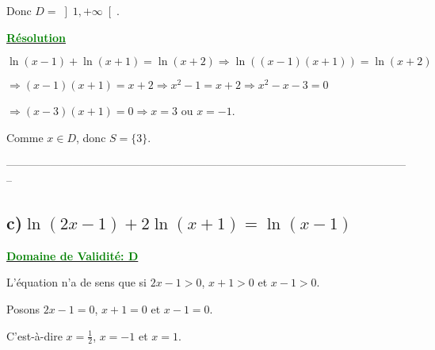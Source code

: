 \documentclass[12pt]{article}
\begin{document}
Donc $D=\left]1, +\infty\right[$.

\textbf{\underline{\textcolor{green}{Résolution}}}

$\ln(x-1) + \ln(x+1) = \ln(x+2) \Longrightarrow \ln((x-1)(x+1)) = \ln(x+2)$

$\Longrightarrow (x-1)(x+1) = x+2 \Longrightarrow x^2 - 1 = x+2 \Longrightarrow x^2 - x - 3 = 0$

$\Longrightarrow (x-3)(x+1) = 0 \Longrightarrow x=3$ ou $x=-1$.

Comme $x \in D$, donc $S=\{3\}$.

--------------------------------------------------------------------------------------------------------------

\subsection*{c)$\ln(2x-1)+2\ln(x+1)=\ln(x-1)$}
\textbf{\underline{\textcolor{green}{Domaine de Validité: D}}}

L'équation n'a de sens que si $2x-1>0$, $x+1>0$ et $x-1>0$.

Posons $2x-1=0$, $x+1=0$ et $x-1=0$.

C'est-à-dire $x=\frac{1}{2}$, $x=-1$ et $x=1$.
\end{document}
